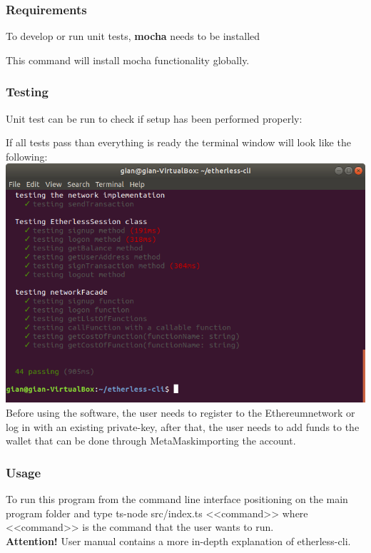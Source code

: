 \subsubsection{Requirements}
To develop or run unit tests, \textbf{mocha} needs to be installed
\begin{center}
\end{center}
This command will install mocha functionality globally.

\subsubsection{Testing}
Unit test can be run to check if setup has been performed properly:
\begin{center}
\end{center}

If all tests pass than everything is ready the terminal window will look like the following:
\includegraphics[width=\textwidth]{res/img/npmruntest.png}
Before using the software, the user needs to register to the Ethereum\glo network or log in with an existing private-key\glo, after that, the user needs to add funds to the wallet that can be done through MetaMask\glo importing the account.
\subsubsection{Usage}
To run this program from the command line interface positioning on the main program folder
and type ts-node src/index.ts <<command>> where <<command>> is the command that the user wants to run.\\
\textbf{Attention!} User manual contains a more in-depth explanation of etherless-cli.
